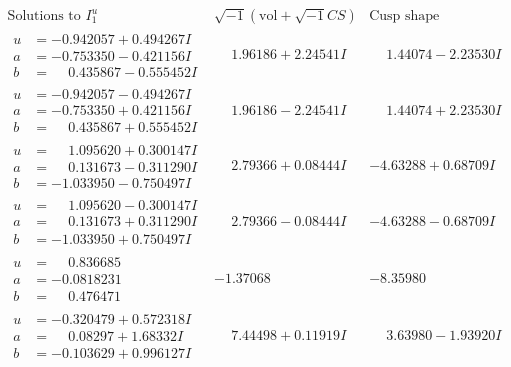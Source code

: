 \documentclass[1p]{elsarticle_modified}
\theoremstyle{definition}
\newcommand{\I}{\sqrt{-1}}
\begin{document}
$$\begin{array}{c|c|c}  
\text{Solutions to }I^u_{1}& \I (\text{vol} + \sqrt{-1}CS) & \text{Cusp shape}\\
 \hline 
\begin{aligned}
u &= -0.942057 + 0.494267 I \\
a &= -0.753350 - 0.421156 I \\
b &= \phantom{-}0.435867 - 0.555452 I\end{aligned}
 & \phantom{-}1.96186 + 2.24541 I & \phantom{-}1.44074 - 2.23530 I \\ \hline\begin{aligned}
u &= -0.942057 - 0.494267 I \\
a &= -0.753350 + 0.421156 I \\
b &= \phantom{-}0.435867 + 0.555452 I\end{aligned}
 & \phantom{-}1.96186 - 2.24541 I & \phantom{-}1.44074 + 2.23530 I \\ \hline\begin{aligned}
u &= \phantom{-}1.095620 + 0.300147 I \\
a &= \phantom{-}0.131673 - 0.311290 I \\
b &= -1.033950 - 0.750497 I\end{aligned}
 & \phantom{-}2.79366 + 0.08444 I & -4.63288 + 0.68709 I \\ \hline\begin{aligned}
u &= \phantom{-}1.095620 - 0.300147 I \\
a &= \phantom{-}0.131673 + 0.311290 I \\
b &= -1.033950 + 0.750497 I\end{aligned}
 & \phantom{-}2.79366 - 0.08444 I & -4.63288 - 0.68709 I \\ \hline\begin{aligned}
u &= \phantom{-}0.836685\phantom{ +0.000000I} \\
a &= -0.0818231\phantom{ +0.000000I} \\
b &= \phantom{-}0.476471\phantom{ +0.000000I}\end{aligned}
 & -1.37068\phantom{ +0.000000I} & -8.35980\phantom{ +0.000000I} \\ \hline\begin{aligned}
u &= -0.320479 + 0.572318 I \\
a &= \phantom{-}0.08297 + 1.68332 I \\
b &= -0.103629 + 0.996127 I\end{aligned}
 & \phantom{-}7.44498 + 0.11919 I & \phantom{-}3.63980 - 1.93920 I \\ \hline\begin{aligned}

\end{aligned}
\end{array}$$
\end{document}
